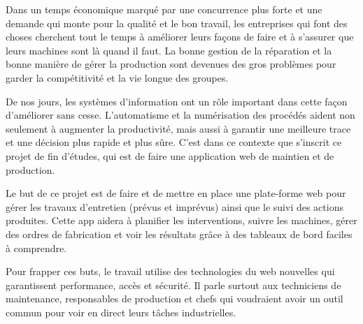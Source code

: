 Dans un temps économique marqué par une concurrence plus forte et une demande qui monte pour la qualité et le bon travail, les entreprises qui font des choses cherchent tout le temps à améliorer leurs façons de faire et à s'assurer que leurs machines sont là quand il faut. La bonne gestion de la réparation et la bonne manière de gérer la production sont devenues des gros problèmes pour garder la compétitivité et la vie longue des groupes.

\vspace{1cm}

De nos jours, les systèmes d’information ont un rôle important dans cette façon d’améliorer sans cesse. L’automatisme et la numérisation des procédés aident non seulement à augmenter la productivité, mais aussi à garantir une meilleure trace et une décision plus rapide et plus sûre. C’est dans ce contexte que s'inscrit ce projet de fin d'études, qui est de faire une application web de maintien et de production.
\vspace{1cm}


Le but de ce projet est de faire et de mettre en place une plate-forme web pour gérer les travaux d'entretien (prévus et imprévus) ainsi que le suivi des actions produites. Cette app aidera à planifier les interventions, suivre les machines, gérer des ordres de fabrication et voir les résultats grâce à des tableaux de bord faciles à comprendre.

\vspace{1cm}


Pour frapper ces buts, le travail utilise des technologies du web nouvelles qui garantissent performance, accès et sécurité. Il parle surtout aux techniciens de maintenance, responsables de production et chefs qui voudraient avoir un outil commun pour voir en direct leurs tâches industrielles.

\vspace{1cm}
